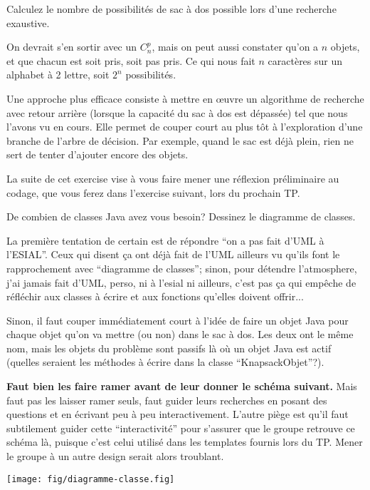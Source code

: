 \documentclass[10pt]{article}\usepackage[correction,nu]{esial}%
\begin{document}
\Question Calculez le nombre de possibilités de sac à dos possible lors d'une
recherche exaustive.

\begin{Reponse}
  On devrait s'en sortir avec un $C_n^p$, mais on peut aussi constater qu'on a
  $n$ objets, et que chacun est soit pris, soit pas pris. Ce qui nous fait $n$
  caractères sur un alphabet à 2 lettre, soit $2^n$ possibilités.
\end{Reponse}

\medskip Une approche plus efficace consiste à mettre en œuvre un algorithme de
recherche avec retour arrière (lorsque la capacité du sac à dos est dépassée)
tel que nous l'avons vu en cours. Elle permet de couper court au plus tôt à
l'exploration d'une branche de l'arbre de décision. Par exemple, quand le sac
est déjà plein, rien ne sert de tenter d'ajouter encore des objets.

La suite de cet exercise vise à vous faire mener une réflexion préliminaire au
codage, que vous ferez dans l'exercise suivant, lors du prochain TP.

\Question De combien de classes Java avez vous besoin? Dessinez le
diagramme de classes.

\begin{Reponse}
  La première tentation de certain est de répondre ``on a pas fait d'UML à
  l'ESIAL''. Ceux qui disent ça ont déjà fait de l'UML ailleurs vu qu'ils font
  le rapprochement avec ``diagramme de classes''; sinon, pour détendre
  l'atmosphere, j'ai jamais fait d'UML, perso, ni à l'esial ni ailleurs, c'est
  pas ça qui empêche de réfléchir aux classes à écrire et aux fonctions
  qu'elles doivent offrir...

  Sinon, il faut couper immédiatement court à l'idée de faire un objet Java
  pour chaque objet qu'on va mettre (ou non) dans  le sac à dos. Les deux ont
  le même nom, mais les objets du problème sont passifs là où un objet Java est
  actif (quelles seraient les méthodes à écrire dans la classe
  ``KnapsackObjet''?).

  \textbf{Faut bien les faire ramer avant de leur donner le schéma suivant.}
  Mais faut pas les laisser ramer seuls, faut guider leurs recherches en
  posant des questions et en écrivant peu à peu interactivement. L'autre piège
  est qu'il faut subtilement guider cette ``interactivité'' pour s'assurer
  que le groupe retrouve ce schéma là, puisque c'est celui utilisé dans les 
  templates fournis lors du TP. Mener le groupe à un autre design serait
  alors troublant.

  \texttt{[image: fig/diagramme-classe.fig]}
\end{Reponse}
\end{document}
